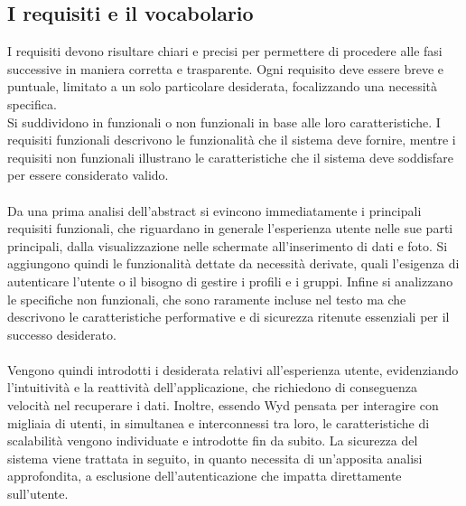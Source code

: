 \subsection{I requisiti e il vocabolario}
I requisiti devono risultare chiari e precisi
per permettere di procedere alle fasi successive in maniera corretta e trasparente.
Ogni requisito deve essere breve e puntuale, limitato a un solo particolare desiderata,
focalizzando una necessità specifica.\\
Si suddividono in funzionali o non funzionali in base alle loro caratteristiche.
I requisiti funzionali descrivono le funzionalità che il sistema deve fornire,
mentre i requisiti non funzionali illustrano le caratteristiche che il sistema deve soddisfare per essere considerato valido.\\
\\
Da una prima analisi dell'abstract si evincono immediatamente i principali requisiti funzionali,
che riguardano in generale l'esperienza utente nelle sue parti principali,
dalla visualizzazione nelle schermate all'inserimento di dati e foto.
Si aggiungono quindi le funzionalità dettate da necessità derivate,
quali l'esigenza di autenticare l'utente o il bisogno di gestire i profili e i gruppi.
Infine si analizzano le specifiche non funzionali,
che sono raramente incluse nel testo ma che descrivono le caratteristiche performative e di sicurezza
ritenute essenziali per il successo desiderato.\\
\\
Vengono quindi introdotti i desiderata relativi all'esperienza utente,
evidenziando l'intuitività e la reattività dell'applicazione,
che richiedono di conseguenza velocità nel recuperare i dati.
Inoltre, essendo Wyd pensata per interagire con migliaia di utenti,
in simultanea e interconnessi tra loro, le caratteristiche di scalabilità vengono individuate e introdotte fin da subito.
La sicurezza del sistema viene trattata in seguito,
in quanto necessita di un'apposita analisi approfondita,
a esclusione dell'autenticazione che impatta direttamente sull'utente.\\

